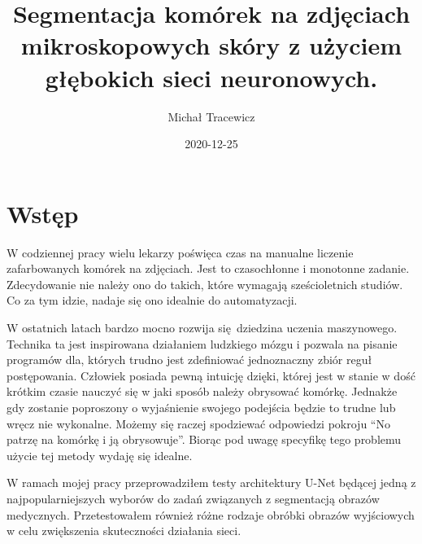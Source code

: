 \documentclass{article}
\title{Segmentacja komórek na zdjęciach mikroskopowych skóry z użyciem głębokich sieci neuronowych.}
\date{2020-12-25}
\author{Michał Tracewicz}
\begin{document}
\maketitle
\newpage
\tableofcontents
\newpage
\section{Wstęp}
W codziennej pracy wielu lekarzy poświęca czas na manualne liczenie zafarbowanych komórek na zdjęciach.
Jest to czasochłonne i monotonne zadanie.
Zdecydowanie nie należy ono do takich, które wymagają sześcioletnich studiów.
Co za tym idzie, nadaje się ono idealnie do automatyzacji.

W ostatnich latach bardzo mocno rozwija się dziedzina uczenia maszynowego.
Technika ta jest inspirowana działaniem ludzkiego mózgu i pozwala na pisanie programów dla, których trudno jest zdefiniować jednoznaczny zbiór reguł postępowania.
Człowiek posiada pewną intuicję dzięki, której jest w stanie w dość krótkim czasie nauczyć się w jaki sposób należy obrysować komórkę.
Jednakże gdy zostanie poproszony o wyjaśnienie swojego podejścia będzie to trudne lub wręcz nie wykonalne.
Możemy się raczej spodziewać odpowiedzi pokroju ``No patrzę na komórkę i ją obrysowuje''.
Biorąc pod uwagę specyfikę tego problemu użycie tej metody wydaję się idealne.

W ramach mojej pracy przeprowadziłem testy architektury U-Net będącej jedną z najpopularniejszych wyborów do zadań związanych z segmentacją obrazów medycznych.
Przetestowałem również różne rodzaje obróbki obrazów wyjściowych w celu zwiększenia skuteczności działania sieci.
\end{document}

